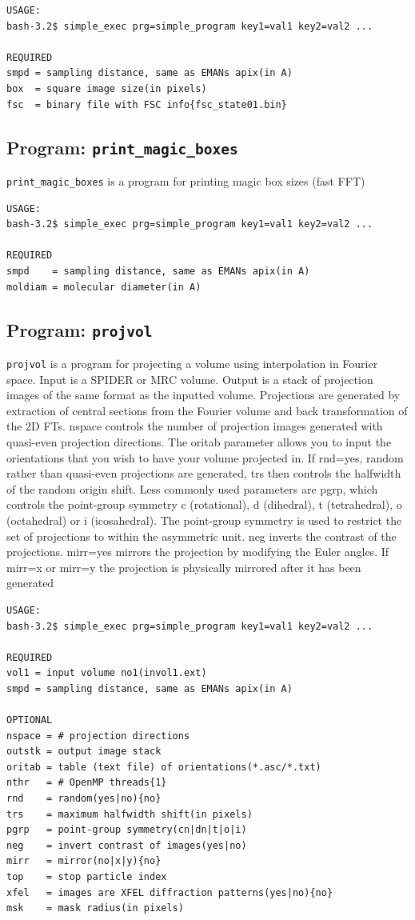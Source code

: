 \documentclass[a4paper,11pt]{article}
\newcommand{\prgname}[1]{\textcolor{NavyBlue}{\texttt{#1}}}
\begin{document}
\begin{verbatim}
USAGE:
bash-3.2$ simple_exec prg=simple_program key1=val1 key2=val2 ...

REQUIRED
smpd = sampling distance, same as EMANs apix(in A)
box  = square image size(in pixels)
fsc  = binary file with FSC info{fsc_state01.bin}
\end{verbatim}

\subsection{Program: \prgname{print\_magic\_boxes}}
\label{print_magic_boxes}
\prgname{print\_magic\_boxes} is a program for printing magic box sizes (fast FFT)

\begin{verbatim}
USAGE:
bash-3.2$ simple_exec prg=simple_program key1=val1 key2=val2 ...

REQUIRED
smpd    = sampling distance, same as EMANs apix(in A)
moldiam = molecular diameter(in A)
\end{verbatim}

\subsection{Program: \prgname{projvol}}
\label{projvol}
\prgname{projvol} is a program for projecting a volume using interpolation in Fourier space. Input is a SPIDER or MRC volume. Output is a stack of projection images of the same format as the inputted volume. Projections are generated by extraction of central sections from the Fourier volume and back transformation of the 2D FTs. nspace controls the number of projection images generated with quasi-even projection directions. The oritab parameter allows you to input the orientations that you wish to have your volume projected in. If rnd=yes, random rather than quasi-even projections are generated, trs then controls the halfwidth of the random origin shift. Less commonly used parameters are pgrp, which controls the point-group symmetry c (rotational), d (dihedral), t (tetrahedral), o (octahedral) or i (icosahedral). The point-group symmetry is used to restrict the set of projections to within the asymmetric unit. neg inverts the contrast of the projections. mirr=yes mirrors the projection by modifying the Euler angles. If mirr=x or mirr=y the projection is physically mirrored after it has been generated

\begin{verbatim}
USAGE:
bash-3.2$ simple_exec prg=simple_program key1=val1 key2=val2 ...

REQUIRED
vol1 = input volume no1(invol1.ext)
smpd = sampling distance, same as EMANs apix(in A)

OPTIONAL
nspace = # projection directions
outstk = output image stack
oritab = table (text file) of orientations(*.asc/*.txt)
nthr   = # OpenMP threads{1}
rnd    = random(yes|no){no}
trs    = maximum halfwidth shift(in pixels)
pgrp   = point-group symmetry(cn|dn|t|o|i)
neg    = invert contrast of images(yes|no)
mirr   = mirror(no|x|y){no}
top    = stop particle index
xfel   = images are XFEL diffraction patterns(yes|no){no}
msk    = mask radius(in pixels)
\end{verbatim}
\end{document}
